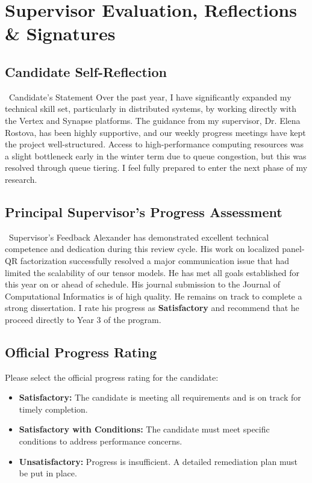 \section{Supervisor Evaluation, Reflections \& Signatures}

\subsection{Candidate Self-Reflection}
\begin{noticebox}{\faPen\ Candidate's Statement}
  Over the past year, I have significantly expanded my technical skill set, particularly in distributed systems, by working directly with the Vertex and Synapse platforms. The guidance from my supervisor, Dr. Elena Rostova, has been highly supportive, and our weekly progress meetings have kept the project well-structured. Access to high-performance computing resources was a slight bottleneck early in the winter term due to queue congestion, but this was resolved through queue tiering. I feel fully prepared to enter the next phase of my research.
\end{noticebox}

\subsection{Principal Supervisor's Progress Assessment}
\begin{noticebox}{\faCommentDots\ Supervisor's Feedback}
  Alexander has demonstrated excellent technical competence and dedication during this review cycle. His work on localized panel-QR factorization successfully resolved a major communication issue that had limited the scalability of our tensor models. He has met all goals established for this year on or ahead of schedule. His journal submission to the Journal of Computational Informatics is of high quality. He remains on track to complete a strong dissertation. I rate his progress as \textbf{Satisfactory} and recommend that he proceed directly to Year 3 of the program.
\end{noticebox}

\subsection{Official Progress Rating}
Please select the official progress rating for the candidate:
\begin{itemize}[label={$\square$}]
  \item \textbf{Satisfactory:} The candidate is meeting all requirements and is on track for timely completion.
  \item \textbf{Satisfactory with Conditions:} The candidate must meet specific conditions to address performance concerns.
  \item \textbf{Unsatisfactory:} Progress is insufficient. A detailed remediation plan must be put in place.
\end{itemize}

